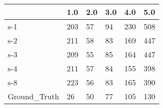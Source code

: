 \begin{tabular}{llllll}
\toprule
{} &  1.0 & 2.0 & 3.0 &  4.0 &  5.0 \\
\midrule
s-1          &  203 &  57 &  94 &  230 &  508 \\
s-2          &  211 &  58 &  83 &  169 &  447 \\
s-3          &  209 &  55 &  85 &  164 &  447 \\
s-4          &  211 &  57 &  84 &  155 &  398 \\
s-8          &  223 &  56 &  83 &  165 &  390 \\
Ground\_Truth &   26 &  50 &  77 &  105 &  130 \\
\bottomrule
\end{tabular}
